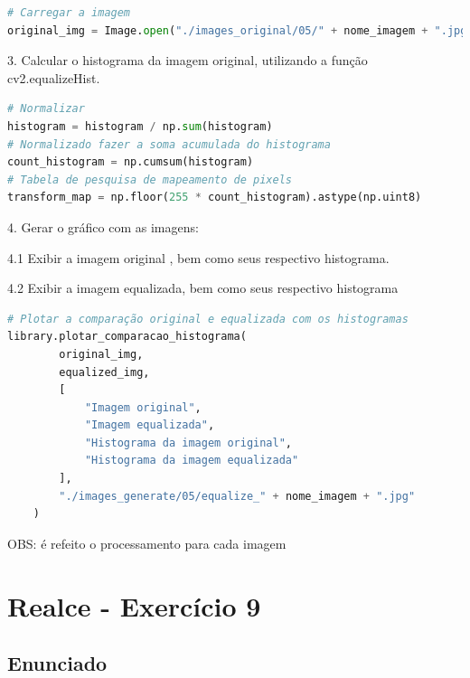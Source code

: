 \documentclass[10pt,a4paper]{article}
\begin{document}
\begin{lstlisting}[language=Python]       
# Carregar a imagem
original_img = Image.open("./images_original/05/" + nome_imagem + ".jpg")
\end{lstlisting}

\begin{flushleft}
3. Calcular o histograma da imagem original, utilizando a função cv2.equalizeHist.
\end{flushleft}

\begin{lstlisting}[language=Python]    
# Normalizar
histogram = histogram / np.sum(histogram)
# Normalizado fazer a soma acumulada do histograma
count_histogram = np.cumsum(histogram)
# Tabela de pesquisa de mapeamento de pixels
transform_map = np.floor(255 * count_histogram).astype(np.uint8)
\end{lstlisting}

\begin{flushleft}
4. Gerar o gráfico com as imagens:
\end{flushleft}
\begin{flushleft}
4.1 Exibir a imagem original , bem como seus respectivo histograma.
\end{flushleft}
\begin{flushleft}
4.2 Exibir a  imagem equalizada, bem como seus respectivo histograma
\end{flushleft}

\begin{lstlisting}[language=Python]
# Plotar a comparação original e equalizada com os histogramas
library.plotar_comparacao_histograma(
        original_img, 
        equalized_img,
        [
            "Imagem original",
            "Imagem equalizada",
            "Histograma da imagem original",
            "Histograma da imagem equalizada"
        ],
        "./images_generate/05/equalize_" + nome_imagem + ".jpg"
    )
\end{lstlisting}

\begin{flushleft}
OBS: é refeito o processamento para cada imagem
\end{flushleft}

\pagebreak

\section{Realce - Exercício 9}

\subsection{Enunciado}
\end{document}
